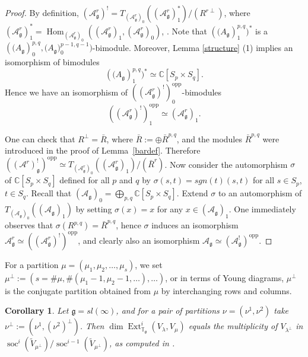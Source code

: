 \documentclass{amsart}
\renewcommand{\sl}{sl}
\newcommand{\Tg}{\mathbb T_{\mathfrak g}}
\renewcommand{\gg}{\mathfrak{g}}
\newtheorem{cor}[thm]{Corollary}
\theoremstyle{definition}
\numberwithin{equation}{section}
\begin{document}
\begin{proof} 
By definition,  $(\mathcal A^r_\gg)^!=T_{(\mathcal   A^r_\gg)_0}((\mathcal  A^r_\gg)_1^*)/(R^{r \perp})$, 
where  $(\mathcal  A^r_\gg)_1^* = \operatorname{Hom}_{(\mathcal  A^r_\gg)_0} ((\mathcal  A^r_\gg)_1, (\mathcal  A^r_\gg)_0)$,
\cite{BGS}. Note that $(\mathcal (A_\gg)_1^{p,q})^*$ is a 
$(\mathcal(A_\gg)_0^{p,q},\mathcal(A_\gg)_0^{p-1,q-1})$-bimodule. Moreover,
Lemma \ref{structure} (1) implies an isomorphism of
bimodules
$$(\mathcal (A_\gg)_1^{p,q})^*\simeq\mathbb C[S_p\times S_q].$$
Hence  we have an isomorphism of $((\mathcal A^r_\gg)^!)^\mathrm{opp}_0$-bimodules 
$$((\mathcal A^r_\gg)^!)^\mathrm{opp}_1\simeq (\mathcal A^r_\gg)_1.$$
  
One can check that
  $R^\perp=\bar R$, where $\bar R:=\oplus \bar R^{p,q}$, and the
modules $\bar R^{p,q}$ were introduced in the proof of
Lemma~\ref{bardef}. Therefore  
$((\mathcal  A^r)_\gg^!)^{\mathrm {opp}} \simeq T_{(\mathcal  A^r_\gg)_0}((\mathcal  A^r_\gg)_1)/(\bar R^r)$.
Now consider the automorphism $\sigma$ of $\mathbb C[S_p\times S_q]$
defined for all $p$ and $q$ by $\sigma(s, t)=sgn(t)(s, t)$ for
all $s\in S_p$, $t\in S_q$. Recall that $(\mathcal A_\gg)_0=\bigoplus_{p,q}\mathbb C[S_p\times S_q]$.  
Extend $\sigma$ to an automorphism of $T_{(\mathcal  A_\gg)_0}((\mathcal  A_\gg)_1)$ 
by setting $\sigma(x)=x$ for any $x\in (\mathcal A_\gg)_1$. One
immediately observes that $\sigma(R^{p,q})=\bar R^{p,q}$, hence
$\sigma$ induces an isomorphism $\mathcal{A}^r_\gg \simeq
((\mathcal{A}^r_\gg)^!)^\mathrm{opp}$, 
and clearly also an isomorphism $\mathcal{A}_\gg \simeq (\mathcal{A}_\gg^!)^\mathrm{opp}$.  
\end{proof}

For a partition $\mu = (\mu_1, \mu_2, \ldots, \mu_s)$, we set
$\mu^\perp := (s = \# \mu, \# (\mu_1 - 1, \mu_2 - 1, \ldots),\ldots)$, or in terms of Young diagrams, $\mu^\perp$ is the
conjugate partition obtained from $\mu$ by interchanging rows and columns.

\begin{cor}  \label{multiplicity}
Let  $\gg=\sl(\infty)$, and for a pair of partitions $\nu = (\nu^1, \nu^2)$ take $\nu^\perp:=(\nu^1,(\nu^2)^\perp)$. Then
  $\operatorname{dim}\operatorname{Ext}^i_{\Tg}(V_\lambda,V_\mu)$ equals the multiplicity of
$V_{\lambda^\perp}$ in $\operatorname{soc}^i(\tilde{V}_{\mu^\perp})/\operatorname{soc}^{i-1}(\tilde{V}_{\mu^\perp})$, as computed in \cite[Theorem 2.3]{PStyr}.
\end{cor}
\end{document}
